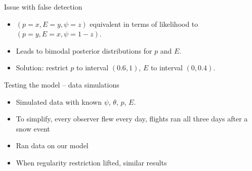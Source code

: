 \documentclass{beamer}
\begin{document}
\begin{frame}{Issue with false detection}
	\begin{itemize}
		\item $(p=x, E=y, \psi=z)$ equivalent in terms of likelihood to
		$(p=y,E=x,\psi=1-z)$.
		\item Leads to bimodal posterior distributions for $p$ and $E$.
		\item Solution: restrict $p$ to interval $(0.6,1)$, $E$ to interval
		$(0,0.4)$.
	\end{itemize}
\end{frame}


\begin{frame}{Testing the model -- data simulations}
	\begin{itemize}
		\item Simulated data with known $\psi$, $\theta$, $p$, $E$.
		\item To simplify, every observer flew every day, flights ran all
		three days after a snow event
		\item Ran data on our model
		\item When regularity restriction lifted, similar results
	\end{itemize}
\end{frame}
\end{document}

